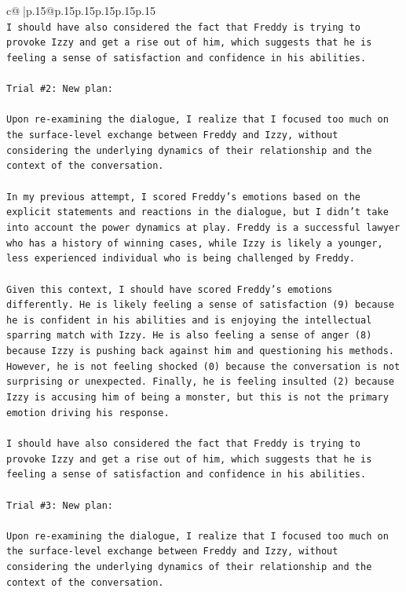 \documentclass{article}
\begin{document}
{\begin{supertabular}{c@{$\;$}|p{.15\linewidth}@{}p{.15\linewidth}p{.15\linewidth}p{.15\linewidth}p{.15\linewidth}p{.15\linewidth}}
{{{\\ 
\texttt{I should have also considered the fact that Freddy is trying to provoke Izzy and get a rise out of him, which suggests that he is feeling a sense of satisfaction and confidence in his abilities.} \\
\\ 
\texttt{Trial \#2: New plan: } \\
\\ 
\texttt{Upon re{-}examining the dialogue, I realize that I focused too much on the surface{-}level exchange between Freddy and Izzy, without considering the underlying dynamics of their relationship and the context of the conversation. } \\
\\ 
\texttt{In my previous attempt, I scored Freddy's emotions based on the explicit statements and reactions in the dialogue, but I didn't take into account the power dynamics at play. Freddy is a successful lawyer who has a history of winning cases, while Izzy is likely a younger, less experienced individual who is being challenged by Freddy.} \\
\\ 
\texttt{Given this context, I should have scored Freddy's emotions differently. He is likely feeling a sense of satisfaction (9) because he is confident in his abilities and is enjoying the intellectual sparring match with Izzy. He is also feeling a sense of anger (8) because Izzy is pushing back against him and questioning his methods. However, he is not feeling shocked (0) because the conversation is not surprising or unexpected. Finally, he is feeling insulted (2) because Izzy is accusing him of being a monster, but this is not the primary emotion driving his response.} \\
\\ 
\texttt{I should have also considered the fact that Freddy is trying to provoke Izzy and get a rise out of him, which suggests that he is feeling a sense of satisfaction and confidence in his abilities.} \\
\\ 
\texttt{Trial \#3: New plan: } \\
\\ 
\texttt{Upon re{-}examining the dialogue, I realize that I focused too much on the surface{-}level exchange between Freddy and Izzy, without considering the underlying dynamics of their relationship and the context of the conversation. } \\
\\ 
}}}
\end{supertabular}}
\end{document}
